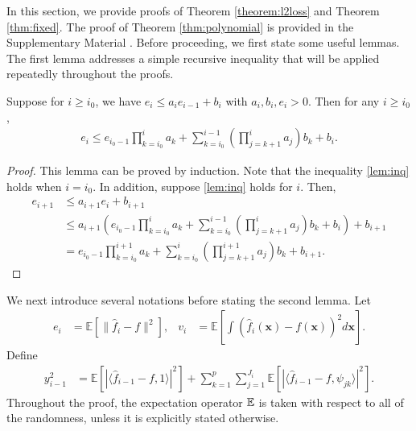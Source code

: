 In this section, we provide proofs of Theorem \ref{theorem:l2loss} and Theorem \ref{thm:fixed}. The proof of Theorem \ref{thm:polynomial} is provided in the Supplementary Material \citep{chen2025supplement}. Before proceeding, we first state some useful lemmas. The first lemma addresses a simple recursive inequality that will be applied repeatedly throughout the proofs.
\begin{lemma}\label{lem}
    Suppose for $i\geq i_0$, we have $e_i \leq a_ie_{i-1} + b_i$ with $a_i,b_i,e_i >0$. Then for any $i\geq i_0$,
    \begin{align}\label{lem:inq}
    e_i \leq e_{i_0-1}\prod_{k=i_0}^ia_k + \sum_{k=i_0}^{i-1}\left(\prod_{j=k+1}^i a_j \right)b_k + b_i.
    \end{align}
\end{lemma}
\begin{proof}
    This lemma can be proved by induction. Note that the inequality \eqref{lem:inq} holds when $i=i_0$. In addition, suppose \eqref{lem:inq} holds for $i$. Then,
\begin{align*}
    e_{i+1} &\leq a_{i+1}e_{i} + b_{i+1}\\
    &\leq a_{i+1}\left( e_{i_0-1}\prod_{k=i_0}^ia_k + \sum_{k=i_0}^{i-1}\left(\prod_{j=k+1}^i a_j \right)b_k + b_i \right) + b_{i+1}\\
    &= e_{i_0-1}\prod_{k=i_0}^{i+1}a_k + \sum_{k=i_0}^{i}\left(\prod_{j=k+1}^{i+1} a_j \right)b_k + b_{i+1}. \tag*{\qedhere}
\end{align*}
\end{proof}
We next introduce several notations before stating the second lemma. Let
\begin{align*}
    e_i &= \mathbb{E}\left[\|\hat{f}_i - f\|^2\right], 
    & v_i &= \mathbb{E}\left[ \int \left( \hat{f}_{i}(\boldsymbol{x}) - f(\boldsymbol{x}) \right)^2 d\boldsymbol{x} \right].
\end{align*}
Define
\begin{align}
    y_{i-1}^2 &= \mathbb{E}\left[ \left| \langle \hat{f}_{i-1} - f, 1 \rangle \right|^2 \right] 
    + \sum_{k=1}^p \sum_{j=1}^{J_i} \mathbb{E}\left[ \left| \langle \hat{f}_{i-1} - f, \psi_{jk} \rangle \right|^2 \right].\label{def:yi}
\end{align}
Throughout the proof, the expectation operator $\mathbb{E}$ is taken with respect to all of the randomness, unless it is explicitly stated otherwise.

